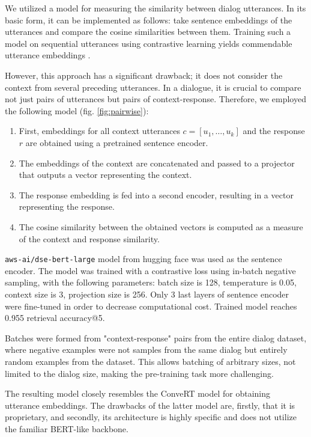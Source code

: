 \documentclass{article}
\begin{document}
We utilized a model for measuring the similarity between dialog utterances. In its basic form, it can be implemented as follows: take sentence embeddings of the utterances and compare the cosine similarities between them. Training such a model on sequential utterances using contrastive learning yields commendable utterance embeddings \cite{Zhou2022}.

However, this approach has a significant drawback; it does not consider the context from several preceding utterances. In a dialogue, it is crucial to compare not just pairs of utterances but pairs of context-response. Therefore, we employed the following model (fig. \ref{fig:pairwise}):

\begin{enumerate}
    \item  First, embeddings for all context utterances $c=[u_1,\ldots,u_k]$ and the response $r$ are obtained using a pretrained sentence encoder.
    \item The embeddings of the context are concatenated and passed to a projector that outputs a vector representing the context.
    \item The response embedding is fed into a second encoder, resulting in a vector representing the response.
    \item The cosine similarity between the obtained vectors is computed as a measure of the context and response similarity.
\end{enumerate}

\texttt{aws-ai/dse-bert-large} model from hugging face \cite{wolf2020huggingfaces} was used as the sentence encoder. The model was trained with a contrastive loss using in-batch negative sampling, with the following parameters: batch size is 128, temperature is 0.05, context size is 3, projection size is 256. Only 3 last layers of sentence encoder were fine-tuned in order to decrease computational cost. Trained model reaches 0.955 retrieval accuracy@5. 

Batches were formed from "context-response" pairs from the entire dialog dataset, where negative examples were not samples from the same dialog but entirely random examples from the dataset. This allows batching of arbitrary sizes, not limited to the dialog size, making the pre-training task more challenging.

The resulting model closely resembles the ConveRT model \cite{henderson2020convert} for obtaining utterance embeddings. The drawbacks of the latter model are, firstly, that it is proprietary, and secondly, its architecture is highly specific and does not utilize the familiar BERT-like backbone.
\end{document}

